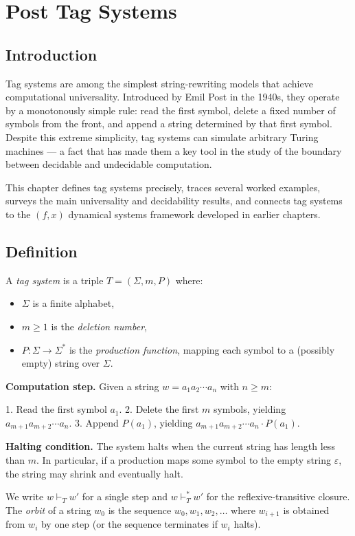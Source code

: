 \chapter{Post Tag Systems}

\section{Introduction}

Tag systems are among the simplest string-rewriting models that achieve computational universality. Introduced by Emil Post in the 1940s, they operate by a monotonously simple rule: read the first symbol, delete a fixed number of symbols from the front, and append a string determined by that first symbol. Despite this extreme simplicity, tag systems can simulate arbitrary Turing machines --- a fact that has made them a key tool in the study of the boundary between decidable and undecidable computation.

This chapter defines tag systems precisely, traces several worked examples, surveys the main universality and decidability results, and connects tag systems to the $(f, x)$ dynamical systems framework developed in earlier chapters.

\section{Definition}

\begin{definition}
A \textit{tag system} is a triple $T = (\Sigma, m, P)$ where:

\begin{itemize}
\item $\Sigma$ is a finite alphabet,
\item $m \geq 1$ is the \textit{deletion number},
\item $P: \Sigma \to \Sigma^*$ is the \textit{production function}, mapping each symbol to a (possibly empty) string over $\Sigma$.

\end{itemize}
\textbf{Computation step.} Given a string $w = a_1 a_2 \cdots a_n$ with $n \geq m$:

1. Read the first symbol $a_1$.
2. Delete the first $m$ symbols, yielding $a_{m+1} a_{m+2} \cdots a_n$.
3. Append $P(a_1)$, yielding $a_{m+1} a_{m+2} \cdots a_n \cdot P(a_1)$.

\textbf{Halting condition.} The system halts when the current string has length less than $m$. In particular, if a production maps some symbol to the empty string $\varepsilon$, the string may shrink and eventually halt.

We write $w \vdash_T w'$ for a single step and $w \vdash_T^* w'$ for the reflexive-transitive closure. The \textit{orbit} of a string $w_0$ is the sequence $w_0, w_1, w_2, \ldots$ where $w_{i+1}$ is obtained from $w_i$ by one step (or the sequence terminates if $w_i$ halts).
\end{definition}

